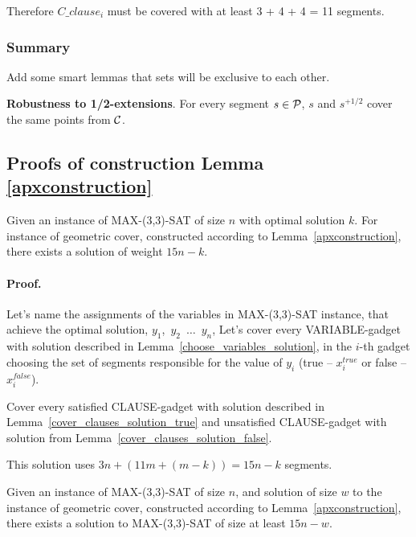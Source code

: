 Therefore $C\_clause_i$ must be covered with at least 3 + 4 + 4 = 11 segments.

\subsubsection{Summary}

Add some smart lemmas that sets will be exclusive to each other.

\begin{lemma}
\textbf{Robustness to 1/2-extensions}. For every segment $s \in \mathcal{P}$,
$s$ and $s^{+1/2}$ cover the same points from $\mathcal{C}$.
\end{lemma}

\subsection{Proofs of construction Lemma \ref{apxconstruction}}
\begin{lemma}
	\label{construction_correctness}
	Given an instance of MAX-(3,3)-SAT of size $n$
	with optimal solution $k$.
	For instance of geometric cover, constructed
	according to Lemma~\ref{apxconstruction}, 
	there exists a solution of weight $15n - k$.
\end{lemma}
\paragraph{Proof.}
Let's name the assignments of the variables in MAX-(3,3)-SAT instance,
that achieve the optimal solution,
$y_1$,~$y_2$~$\ldots$~$y_n$,
Let's cover every VARIABLE-gadget with solution described in
Lemma~\ref{choose_variables_solution},
in the $i$-th gadget choosing the set of segments responsible for the
value of $y_i$
(true -- $x_i^{true}$ or false -- $x_i^{false}$).

Cover every satisfied CLAUSE-gadget with solution described in
Lemma~\ref{cover_clauses_solution_true}
and unsatisfied CLAUSE-gadget with solution from
Lemma~\ref{cover_clauses_solution_false}.

This solution uses $3n + (11m + (m-k)) = 15n - k$ segments.

\begin{lemma}
	\label{construction_completness}
	Given an instance of MAX-(3,3)-SAT of size $n$,
	and solution of size $w$ to the instance of geometric cover,
	constructed	according to Lemma~\ref{apxconstruction},  
	there exists a solution to MAX-(3,3)-SAT of size at least $15n - w$.
\end{lemma}
